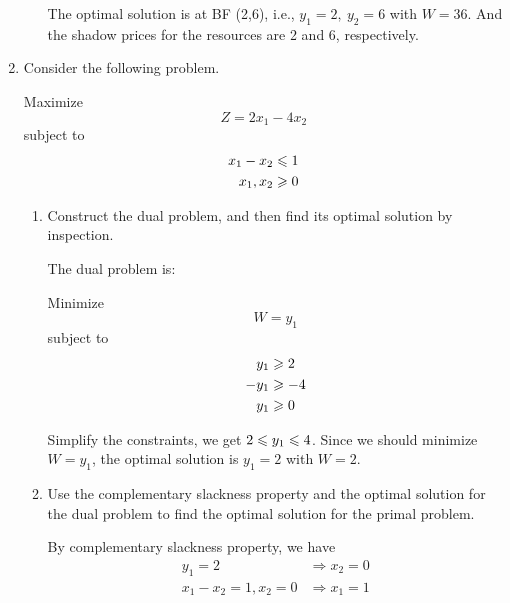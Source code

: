 \documentclass[a4paper]{article}
\begin{document}
\begin{enumerate}
\begin{enumerate}
\begin{solution}
	The optimal solution is at BF (2,6), i.e., $y_1=2,\ y_2=6$ with $W=36$. And the shadow prices for the resources are 2 and 6, respectively.
	\end{solution}
	
\end{enumerate}

\item Consider the following problem.

Maximize $$Z=2x_1-4x_2$$
subject to
\begin{equation*}
\begin{aligned}
x_1-x_2&\leqslant 1\\
x_1,x_2&\geqslant 0\\
\end{aligned}
\end{equation*}
\begin{enumerate}
	\item Construct the dual problem, and then find its optimal solution by inspection.
	
	\begin{solution}
		The dual problem is:
		
		Minimize $$W=y_1$$
		subject to
		\begin{equation*}
		\begin{aligned}
		y_1&\geqslant 2\\
		-y_1&\geqslant -4\\
		y_1&\geqslant 0\\
		\end{aligned}
		\end{equation*}
		
		Simplify the constraints, we get $2\leqslant y_1\leqslant 4$. Since we should minimize $W=y_1$, the optimal solution is $y_1=2$ with $W=2$.
		
	\end{solution}
	
	\item Use the complementary slackness property and the optimal solution for the dual problem to find the optimal solution for the primal problem.
	
	\begin{solution}
		
		By complementary slackness property, we have
		\begin{equation*}
		\begin{aligned}
		y_1=2&\Rightarrow x_2=0\\
		x_1-x_2=1, x_2=0&\Rightarrow x_1=1\\
		\end{aligned}
		\end{equation*}
		

\end{solution}
\end{enumerate}
\end{enumerate}
\end{document}
